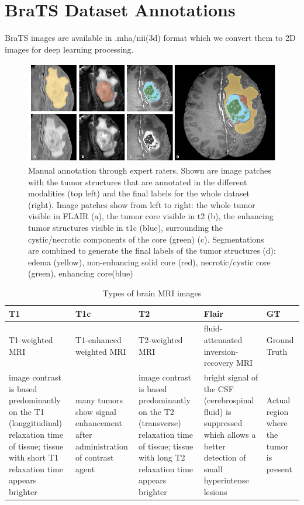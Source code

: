    
\section{BraTS Dataset Annotations}
    
    BraTS images are available in .mha/nii(3d) format which we convert them to 2D images for deep learning processing. \\
    
    \begin{figure}[h!]
        \centering
        \includegraphics[scale=0.5]{Figures/BraTS_Tumors.png}
        \caption[BraTS Dataset Annotations]{Manual annotation through expert raters. Shown are image patches with the tumor structures that are annotated in the different modalities (top left) and the final labels for the whole dataset (right). Image patches show from left to right: the whole tumor visible in FLAIR (a), the tumor core visible in t2 (b), the enhancing tumor structures visible in t1c (blue), surrounding the cystic/necrotic components of the core (green) (c). Segmentations are combined to generate the final labels of the tumor structures (d): edema (yellow), non-enhancing solid core (red), necrotic/cystic core (green), enhancing core(blue)}
        \label{fig:BraTS_Dataset}
    \end{figure}
 
 

   
 \begin{table}[h!]
  \centering
  \caption{Types of brain MRI images}
    \begin{tabular}{|p{4cm}|p{3cm}|p{3cm}|p{3cm}|p{3cm}|}
       \hline
         \textbf{T1} & \textbf{T1c} & \textbf{T2} & \textbf{Flair} & \textbf{GT}\\
            \hline
            T1-weighted MRI & T1-enhanced weighted MRI & T2-weighted MRI & fluid-attenuated inversion-recovery MRI & Ground Truth\\
            \hline
        image contrast is based predominantly on the T1 (longgitudinal) relaxation time of tissue; tissue with short T1 relaxation time appears brighter & many tumors show signal enhancement after administration of contrast agent  & image contrast is based predominantly on the T2 (transverse) relaxation time of tissue; tissue with long T2 relaxation time appears brighter & bright signal of the CSF (cerebrospinal fluid) is suppressed which allows a better detection of small hyperintense lesions &  Actual region where the tumor is present \\
        \hline
            \end{tabular}
            
            \label{tab:my_label}
        \end{table}  
    
    
    
    